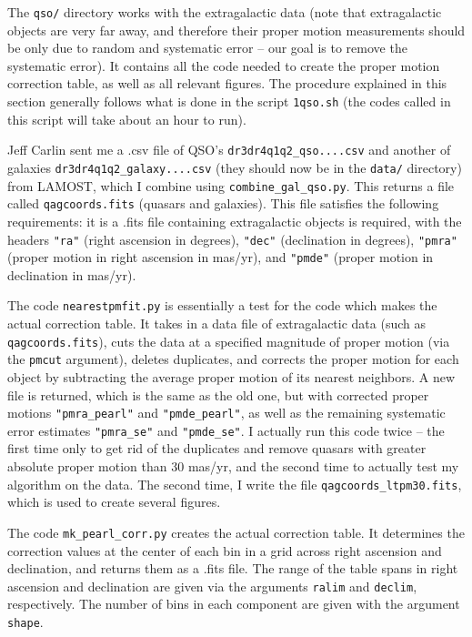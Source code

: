 \documentclass{article}
\begin{document}
The \texttt{qso/} directory works with the extragalactic data (note that extragalactic objects are very far away, and therefore their proper motion measurements should be only due to random and systematic error -- our goal is to remove the systematic error). It contains all the code needed to create the proper motion correction table, as well as all relevant figures. The procedure explained in this section generally follows what is done in the script \texttt{1qso.sh} (the codes called in this script will take about an hour to run).

Jeff Carlin sent me a .csv file of QSO's \texttt{dr3dr4q1q2\_qso....csv} and another of galaxies \texttt{dr3dr4q1q2\_galaxy....csv} (they should now be in the \texttt{data/} directory) from LAMOST, which I combine using \texttt{combine\_gal\_qso.py}. This returns a file called \texttt{qagcoords.fits} (quasars and galaxies). This file satisfies the following requirements: it is a .fits file containing extragalactic objects is required, with the headers \texttt{"ra"} (right ascension in degrees), \texttt{"dec"} (declination in degrees), \texttt{"pmra"} (proper motion in right ascension in mas/yr), and \texttt{"pmde"} (proper motion in declination in mas/yr).

The code \texttt{nearestpmfit.py} is essentially a test for the code which makes the actual correction table. It takes in a data file of extragalactic data (such as \texttt{qagcoords.fits}), cuts the data at a specified magnitude of proper motion (via the \texttt{pmcut} argument), deletes duplicates, and corrects the proper motion for each object by subtracting the average proper motion of its nearest neighbors. A new file is returned, which is the same as the old one, but with corrected proper motions \texttt{"pmra\_pearl"} and \texttt{"pmde\_pearl"}, as well as the remaining systematic error estimates \texttt{"pmra\_se"} and \texttt{"pmde\_se"}. I actually run this code twice -- the first time only to get rid of the duplicates and remove quasars with greater absolute proper motion than 30 mas/yr, and the second time to actually test my algorithm on the data. The second time, I write the file \texttt{qagcoords\_ltpm30.fits}, which is used to create several figures.

The code \texttt{mk\_pearl\_corr.py} creates the actual correction table. It determines the correction values at the center of each bin in a grid across right ascension and declination, and returns them as a .fits file. The range of the table spans in right ascension and declination are given via the arguments \texttt{ralim} and \texttt{declim}, respectively. The number of bins in each component are given with the argument \texttt{shape}.
\end{document}
